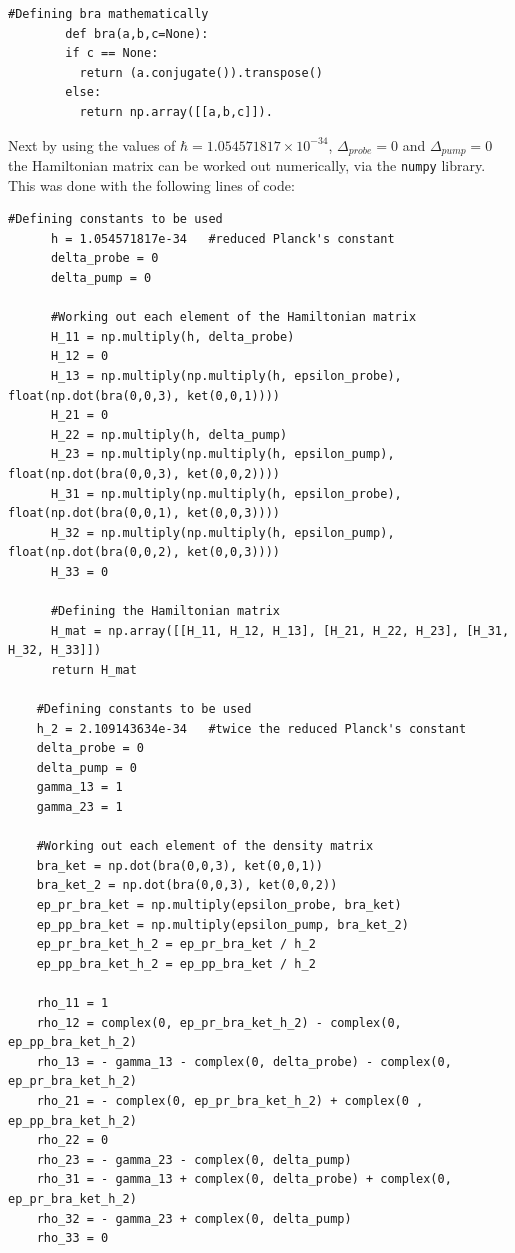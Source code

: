 \documentclass[12pt, a4paper]{article}
\begin{document}
\begin{enumerate}
\begin{lstlisting}[language=iPython]
      #Defining bra mathematically
        def bra(a,b,c=None):
        if c == None:
          return (a.conjugate()).transpose()
        else:
          return np.array([[a,b,c]]).
    \end{lstlisting}
    Next by using the values of \(\hbar = 1.054571817 \times 10^{-34}\), \(\Delta_{probe} = 0\) and \(\Delta_{pump} = 0\) the Hamiltonian matrix can be worked out numerically, via the \lstinline{numpy} library. This was done with the following lines of code:
    \begin{lstlisting}[language=iPython]
      #Defining constants to be used
      h = 1.054571817e-34   #reduced Planck's constant
      delta_probe = 0
      delta_pump = 0
    
      #Working out each element of the Hamiltonian matrix
      H_11 = np.multiply(h, delta_probe)
      H_12 = 0
      H_13 = np.multiply(np.multiply(h, epsilon_probe), float(np.dot(bra(0,0,3), ket(0,0,1))))
      H_21 = 0
      H_22 = np.multiply(h, delta_pump)
      H_23 = np.multiply(np.multiply(h, epsilon_pump), float(np.dot(bra(0,0,3), ket(0,0,2))))
      H_31 = np.multiply(np.multiply(h, epsilon_probe), float(np.dot(bra(0,0,1), ket(0,0,3))))
      H_32 = np.multiply(np.multiply(h, epsilon_pump), float(np.dot(bra(0,0,2), ket(0,0,3))))
      H_33 = 0
    
      #Defining the Hamiltonian matrix
      H_mat = np.array([[H_11, H_12, H_13], [H_21, H_22, H_23], [H_31, H_32, H_33]])
      return H_mat
    
    #Defining constants to be used
    h_2 = 2.109143634e-34   #twice the reduced Planck's constant
    delta_probe = 0
    delta_pump = 0
    gamma_13 = 1
    gamma_23 = 1

    #Working out each element of the density matrix
    bra_ket = np.dot(bra(0,0,3), ket(0,0,1))
    bra_ket_2 = np.dot(bra(0,0,3), ket(0,0,2))
    ep_pr_bra_ket = np.multiply(epsilon_probe, bra_ket)
    ep_pp_bra_ket = np.multiply(epsilon_pump, bra_ket_2)
    ep_pr_bra_ket_h_2 = ep_pr_bra_ket / h_2
    ep_pp_bra_ket_h_2 = ep_pp_bra_ket / h_2

    rho_11 = 1
    rho_12 = complex(0, ep_pr_bra_ket_h_2) - complex(0, ep_pp_bra_ket_h_2)
    rho_13 = - gamma_13 - complex(0, delta_probe) - complex(0, ep_pr_bra_ket_h_2)
    rho_21 = - complex(0, ep_pr_bra_ket_h_2) + complex(0 , ep_pp_bra_ket_h_2)
    rho_22 = 0
    rho_23 = - gamma_23 - complex(0, delta_pump)
    rho_31 = - gamma_13 + complex(0, delta_probe) + complex(0, ep_pr_bra_ket_h_2)
    rho_32 = - gamma_23 + complex(0, delta_pump)
    rho_33 = 0


\end{lstlisting}
\end{enumerate}
\end{document}
